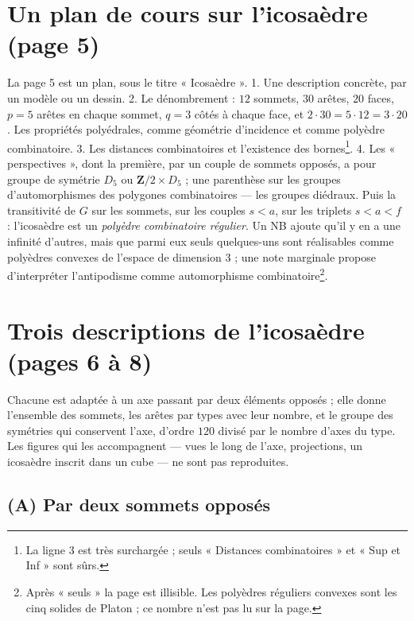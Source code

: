 \documentclass[11pt,a4paper]{article}
\begin{document}
\section*{Un plan de cours sur l'icosaèdre (page 5)}

La page 5 est un plan, sous le titre « Icosaèdre ». 1. Une description concrète,
par un modèle ou un dessin. 2. Le dénombrement : $12$ sommets, $30$ arêtes,
$20$ faces, $p = 5$ arêtes en chaque sommet, $q = 3$ côtés à chaque face, et
$2 \cdot 30 = 5 \cdot 12 = 3 \cdot 20$. Les propriétés polyédrales, comme
géométrie d'incidence et comme polyèdre combinatoire. 3. Les distances
combinatoires et l'existence des bornes\footnote{La ligne 3 est très
surchargée ; seuls « Distances combinatoires » et « Sup et Inf » sont sûrs.}.
4. Les « perspectives », dont la première, par un couple de sommets opposés,
a pour groupe de symétrie $D_5$ ou $\mathbf{Z}/2 \times D_5$ ; une parenthèse
sur les groupes d'automorphismes des polygones combinatoires --- les groupes
diédraux. Puis la transitivité de $G$ sur les sommets, sur les couples
$s < a$, sur les triplets $s < a < f$ : l'icosaèdre est un \emph{polyèdre
combinatoire régulier}. Un NB ajoute qu'il y en a une infinité d'autres, mais
que parmi eux seuls quelques-uns sont réalisables comme polyèdres convexes de
l'espace de dimension $3$ ; une note marginale propose d'interpréter
l'antipodisme comme automorphisme combinatoire\footnote{Après « seuls » la page
est illisible. Les polyèdres réguliers convexes sont les cinq solides de
Platon ; ce nombre n'est pas lu sur la page.}.

\section*{Trois descriptions de l'icosaèdre (pages 6 à 8)}

Chacune est adaptée à un axe passant par deux éléments opposés ; elle donne
l'ensemble des sommets, les arêtes par types avec leur nombre, et le groupe des
symétries qui conservent l'axe, d'ordre $120$ divisé par le nombre d'axes du
type. Les figures qui les accompagnent --- vues le long de l'axe, projections,
un icosaèdre inscrit dans un cube --- ne sont pas reproduites.

\subsection*{(A) Par deux sommets opposés}
\end{document}
